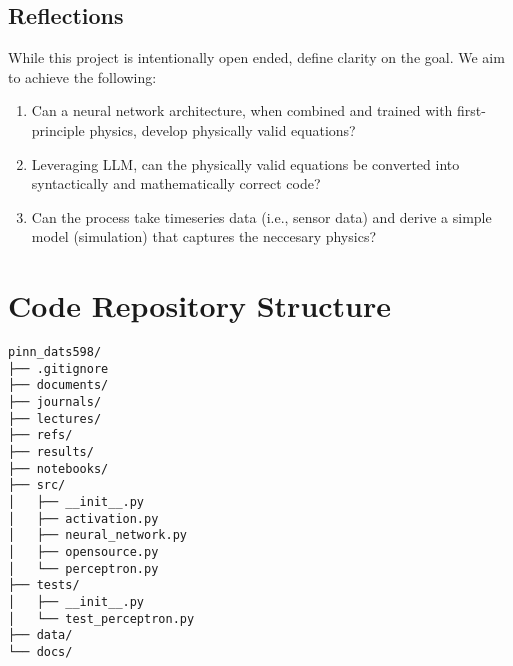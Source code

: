 \documentclass[11pt,letterpaper]{article}
\newcommand{\reflections}[1]{
    \subsection*{Reflections}
    #1
}
\begin{document}
\reflections{
While this project is intentionally open ended, define clarity on the goal. We aim to achieve the following:
\begin{enumerate}
    \item Can a neural network architecture, when combined and trained with first-principle physics, develop physically valid equations?
    \item Leveraging LLM, can the physically valid equations be converted into syntactically and mathematically correct code?
    \item Can the process take timeseries data (i.e., sensor data) and derive a simple model (simulation) that captures the neccesary physics?
\end{enumerate}
}

\newpage


\newpage
\appendix
\section{Code Repository Structure}
\begin{verbatim}
pinn_dats598/
├── .gitignore
├── documents/
├── journals/
├── lectures/
├── refs/
├── results/
├── notebooks/
├── src/
│   ├── __init__.py
│   ├── activation.py
│   ├── neural_network.py
│   ├── opensource.py
│   └── perceptron.py
├── tests/
│   ├── __init__.py
│   └── test_perceptron.py
├── data/
└── docs/
\end{verbatim}
\end{document}
